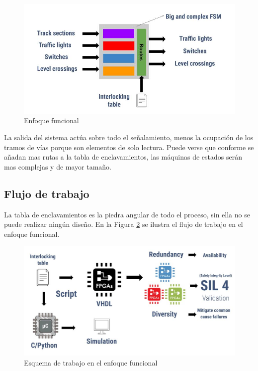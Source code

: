 			\begin{figure}[h!]
			\centering
				\includegraphics[scale=.55]{./Figures/Funcional}
				\caption{Enfoque funcional}
				\label{fig:Modelo_Funcional}
			\end{figure}
		
		\vspace{5cm}
			
		La salida del sistema actúa sobre todo el señalamiento, menos la ocupación de los tramos de vías porque son elementos de solo lectura. Puede verse que conforme se añadan mas rutas a la tabla de enclavamientos, las máquinas de estados serán mas complejas y de mayor tamaño.
	
	\subsection{Flujo de trabajo}
		
		La tabla de enclavamientos es la piedra angular de todo el proceso, sin ella no se puede realizar ningún diseño. En la Figura \ref{fig:Work_Funcional} se ilustra el flujo de trabajo en el enfoque funcional.		
			
		\begin{figure}[h]
		\centering
			\includegraphics[scale=.4]{./Figures/Funcional_workflow}
			\caption{Esquema de trabajo en el enfoque funcional}
			\label{fig:Work_Funcional}
		\end{figure}
	
